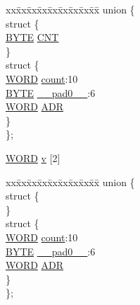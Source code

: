 \begin{DoxyCompactItemize}
\begin{tabbing}
\end{tabbing}\item 
\begin{tabbing}
xx\=xx\=xx\=xx\=xx\=xx\=xx\=xx\=xx\=\kill
union \{\\
\>struct \{\\
\>\>\hyperlink{_generic_type_defs_8h_a4ae1dab0fb4b072a66584546209e7d58}{BYTE} \hyperlink{union_____b_d_t_aa47496fdbb315cdb40ee4b6a18fe21c4}{CNT}\\
\>\} \\
\>struct \{\\
\>\>\hyperlink{_generic_type_defs_8h_a2b0e863dadf920709ec53d9088ee7c91}{WORD} \hyperlink{union_____b_d_t_a25887517a6aa3f9cb2546327c8247a1e}{count}:10\\
\>\>\hyperlink{_generic_type_defs_8h_a4ae1dab0fb4b072a66584546209e7d58}{BYTE} \hyperlink{union_____b_d_t_af4319e81938c5bba16d3bdc146991408}{\_\_pad0\_\_}:6\\
\>\>\hyperlink{_generic_type_defs_8h_a2b0e863dadf920709ec53d9088ee7c91}{WORD} \hyperlink{union_____b_d_t_a9ff8e0fbc95a686640894b480a1ce71f}{ADR}\\
\>\} \\
\}; \\

\end{tabbing}\item 
\hyperlink{_generic_type_defs_8h_a2b0e863dadf920709ec53d9088ee7c91}{W\+O\+R\+D} \hyperlink{union_____b_d_t_a1b3b3cfa7a4d868880bcc6feaadc7971}{v} \mbox{[}2\mbox{]}
\item 
\begin{tabbing}
xx\=xx\=xx\=xx\=xx\=xx\=xx\=xx\=xx\=\kill
union \{\\
\>struct \{\\
\>\} \\
\>struct \{\\
\>\>\hyperlink{_generic_type_defs_8h_a2b0e863dadf920709ec53d9088ee7c91}{WORD} \hyperlink{union_____b_d_t_a25887517a6aa3f9cb2546327c8247a1e}{count}:10\\
\>\>\hyperlink{_generic_type_defs_8h_a4ae1dab0fb4b072a66584546209e7d58}{BYTE} \hyperlink{union_____b_d_t_af4319e81938c5bba16d3bdc146991408}{\_\_pad0\_\_}:6\\
\>\>\hyperlink{_generic_type_defs_8h_a2b0e863dadf920709ec53d9088ee7c91}{WORD} \hyperlink{union_____b_d_t_a9ff8e0fbc95a686640894b480a1ce71f}{ADR}\\
\>\} \\
\}; \\


\end{tabbing}
\end{DoxyCompactItemize}
